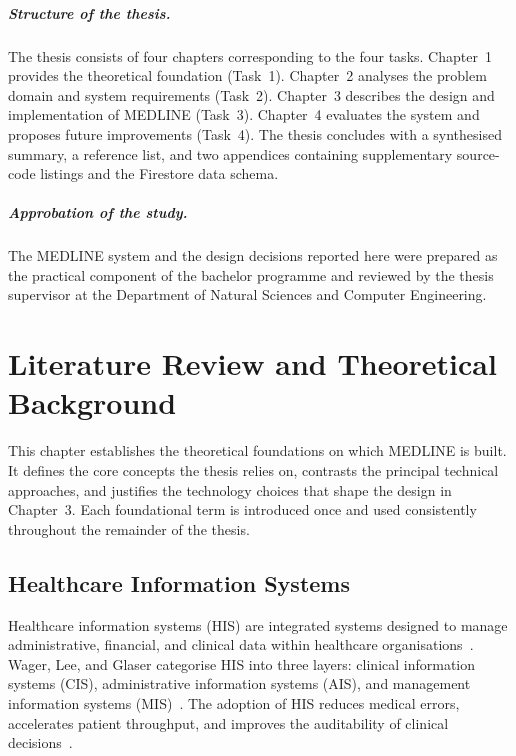 \documentclass[12pt,a4paper,oneside]{report}
\begin{document}
\paragraph{Structure of the thesis.}
The thesis consists of four chapters corresponding to the four tasks.
Chapter~1 provides the theoretical foundation (Task~1). Chapter~2 analyses the
problem domain and system requirements (Task~2). Chapter~3 describes the design
and implementation of MEDLINE (Task~3). Chapter~4 evaluates the system and
proposes future improvements (Task~4). The thesis concludes with a synthesised
summary, a reference list, and two appendices containing supplementary
source-code listings and the Firestore data schema.

\paragraph{Approbation of the study.}
The MEDLINE system and the design decisions reported here were prepared as the
practical component of the bachelor programme and reviewed by the thesis
supervisor at the Department of Natural Sciences and Computer Engineering.

\chapter{Literature Review and Theoretical Background}

This chapter establishes the theoretical foundations on which MEDLINE is built.
It defines the core concepts the thesis relies on, contrasts the principal
technical approaches, and justifies the technology choices that shape the
design in Chapter~3. Each foundational term is introduced once and used
consistently throughout the remainder of the thesis.

\section{Healthcare Information Systems}

Healthcare information systems (HIS) are integrated systems designed to manage
administrative, financial, and clinical data within healthcare
organisations~\cite{wager2017}. Wager, Lee, and Glaser categorise HIS into
three layers: clinical information systems (CIS), administrative information
systems (AIS), and management information systems (MIS)~\cite{wager2017}. The
adoption of HIS reduces medical errors, accelerates patient throughput, and
improves the auditability of clinical decisions~\cite{kruse2018}.
\end{document}
